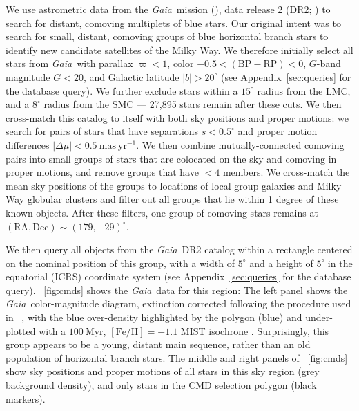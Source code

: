 \documentclass[twocolumn]{aastex62}
\newcommand{\acronym}[1]{{\small{#1}}}
\newcommand{\gaia}{\textsl{Gaia}}
\newcommand{\DR}[1]{\acronym{DR#1}}
\newcommand{\masyr}{\ensuremath{\textrm{mas}~\textrm{yr}^{-1}}}
\newcommand{\feh}{\ensuremath{[\textrm{Fe} / \textrm{H}]}}
\newcommand{\bprp}{\ensuremath{\textrm{BP} - \textrm{RP}}}
\newcommand{\changes}[1]{{\ \color{red}{\textbf{#1}\ }}}
\begin{document}
We use astrometric data from the \gaia\ mission (\citealt{Prusti:2016}), data release 2 (\DR{2}; \citealt{Gaia-Collaboration:2018, Lindegren:2018}) to search for distant, comoving multiplets of blue stars.
Our original intent was to search for small, distant, comoving groups of blue horizontal branch stars to identify new candidate satellites of the Milky Way.
We therefore initially select all stars from \gaia\ with parallax $\varpi < 1$, color $-0.5 < (\bprp) < 0$, $G$-band magnitude $G < 20$, and Galactic latitude $|b| > 20^\circ$ (see Appendix~\ref{sec:queries} for the database query).
We further exclude stars within a $15^\circ$ radius from the LMC, and a $8^\circ$ radius from the SMC --- 27,895 stars remain after these cuts.
We then cross-match this catalog to itself with both sky positions and proper motions: we search for pairs of stars that have separations $s < 0.5^\circ$ and proper motion differences $|\Delta \mu| < 0.5~\masyr$.
We then combine mutually-connected comoving pairs into small groups of stars that are colocated on the sky and comoving in proper motions, and remove groups that have $<4$ members.
We cross-match the mean sky positions of the groups to locations of local group galaxies \citep{McConnachie:2012} and Milky Way globular clusters \citep[2010 edition;][]{Harris:1996} and filter out all groups that lie within 1 degree of these known objects.
After these filters, one group of comoving stars remains at $(\textrm{RA}, \textrm{Dec}) \sim (179, -29)^\circ$.

We then query all objects from the \gaia\ \DR{2} catalog within a rectangle centered on the nominal position of this group, with a width of $5^\circ$ and a height of $5^\circ$ in the equatorial (ICRS) coordinate system (see Appendix~\ref{sec:queries} for the database query).
\figurename~\ref{fig:cmds} shows the \gaia\ data for this region:
The left panel shows the \gaia\ color-magnitude diagram, extinction corrected following the procedure used in \citet{Danielski:2018} \changes{and the coefficients from \citet{Babusiaux:2018}}, with the blue over-density highlighted by the polygon (blue) and under-plotted with a $100~\textrm{Myr}$, $\feh = -1.1$ \acronym{MIST} isochrone \citep[red line;][]{Dotter:2016, Choi:2016, Paxton:2011, Paxton:2013, Paxton:2015}.
Surprisingly, this group appears to be a young, distant main sequence, rather than an old population of horizontal branch stars.
The middle and right panels of \figurename~\ref{fig:cmds} show sky positions and proper motions of all stars in this sky region (grey background density), and only stars in the CMD selection polygon (black markers).
\end{document}
